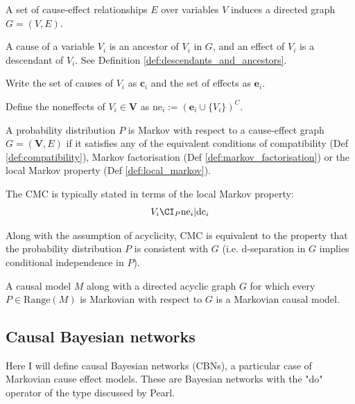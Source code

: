 \begin{definition}
A set of cause-effect relationships $E$ over variables $V$ induces a directed graph $G=(V,E)$. 

A cause of a variable $V_i$ is an ancestor of $V_i$ in $G$, and an effect of $V_i$ is a descendant of $V_i$. See Definition \ref{def:descendants_and_ancestors}.

Write the set of causes of $V_i$ as $\mathbf{c}_i$ and the set of effects as $\mathbf{e}_i$.

\end{definition}

\begin{definition}[Noneffects]
Define the noneffects of $V_i\in\mathbf{V}$ as $\mathrm{ne}_i:= (\mathbf{e}_i\cup \{V_i\})^C$.
\end{definition}

\begin{definition}
A probability distribution $P$ is Markov with respect to a cause-effect graph $G=(\mathbf{V},E)$ if it satisfies any of the equivalent conditions of compatibility (Def \ref{def:compatibility}), Markov factorisation (Def \ref{def:markov_factorisation}) or the local Markov property (Def \ref{def:local_markov}).

The CMC is typically stated in terms of the local Markov property:
\begin{align}
    V_i\CI_P \mathrm{ne}_i | \mathrm{dc}_i
\end{align}
\end{definition}

Along with the assumption of acyclicity, CMC is equivalent to the property that the probability distribution $P$ is consistent with $G$ (i.e. d-separation in $G$ implies conditional independence in $P$). 


\begin{definition}
A causal model $M$ along with a directed acyclic graph $G$ for which every $P\in \mathrm{Range}(M)$ is Markovian with respect to $G$ is a Markovian causal model.
\end{definition}

\subsection{Causal Bayesian networks}

Here I will define causal Bayesian networks (CBNs), a particular case of Markovian cause effect models. These are Bayesian networks with the "do" operator of the type discussed by Pearl.

